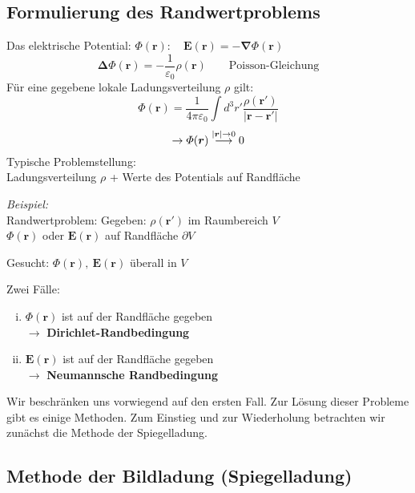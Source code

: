 \documentclass[titlepage,11pt,a4paper,ngerman]{report}
\newcommand{\tx}[1]{\textrm{#1}}
\renewcommand{\Phi}{\varPhi}
\renewcommand{\vec}[1]{\boldsymbol{#1}}
\newcommand{\lcom}[1]{\color{MidnightBlue}#1\color{black}}
\renewcommand{\epsilon}{\varepsilon}
\newcommand{\bei}{\emph{Beispiel: }}
\begin{document}
\subsection{Formulierung des Randwertproblems}

Das elektrische Potential: $ \Phi(\vec{r}): \quad \vec{E}(\vec{r}) = - \vec{\nabla} \Phi(\vec{r}) $\\
$$ \vec{\Delta} \Phi (\vec{r}) = -\frac{1}{\epsilon_0} \rho(\vec{r})  \qquad \tx{Poisson-Gleichung}$$
Für eine gegebene lokale Ladungsverteilung $ \rho $ gilt:
\begin{equation*}
\Phi(\vec{r}) = \frac{1}{4 \pi \epsilon_0} \int d^3 r' \frac{\rho(\vec{r}')}{|\vec{r} - \vec{r}'|}
\end{equation*}
\begin{equation*}
\rightarrow \Phi(\vec{r}) \buildrel |\vec{r}| \rightarrow 0 \over \longrightarrow 0
\end{equation*}
Typische Problemstellung:\\
Ladungsverteilung $\rho$ + Werte des Potentials auf Randfläche

\bei\\ %

Randwertproblem: Gegeben: $\rho(\vec{r}')$ im Raumbereich $V$\\
$\Phi(\vec{r})$ oder $\vec{E}(\vec{r})$ auf Randfläche $\partial V$

Gesucht: $\Phi(\vec{r}),\ \vec{E}(\vec{r})$ überall in $V$

\noindent
Zwei Fälle:
\begin{enumerate}[i)]
	\item $ \Phi(\vec{r}) $ ist auf der Randfläche gegeben\\
	$ \rightarrow $ \textbf{Dirichlet-Randbedingung}
	\item $ \vec{E}(\vec{r}) $ ist auf der Randfläche gegeben\\
	$ \rightarrow $ \textbf{Neumannsche Randbedingung}
\end{enumerate}



\lcom{Wir beschränken uns vorwiegend auf den ersten Fall. }
\lcom{Zur Lösung dieser Probleme gibt es einige Methoden. Zum Einstieg und zur Wiederholung betrachten wir zunächst die Methode der Spiegelladung. }

\subsection{Methode der Bildladung (Spiegelladung)}
\end{document}

